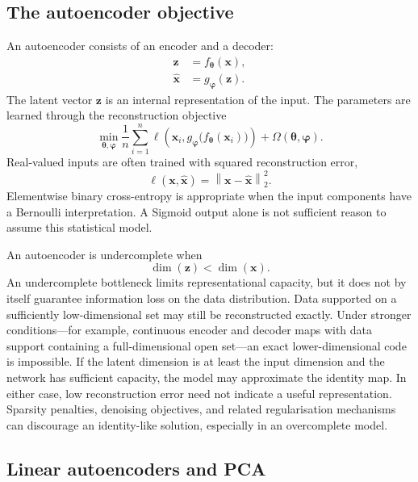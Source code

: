 \subsection{The autoencoder objective}

An autoencoder consists of an encoder and a decoder:
\begin{align}
    \mathbf{z}
    &=f_{\boldsymbol{\theta}}(\mathbf{x}),
    \label{eq:ae-encoder}\\
    \widehat{\mathbf{x}}
    &=g_{\boldsymbol{\varphi}}(\mathbf{z}).
    \label{eq:ae-decoder}
\end{align}
The latent vector \(\mathbf{z}\) is an internal representation of the input. The parameters are learned through the reconstruction objective
\begin{equation}
    \min_{\boldsymbol{\theta},\boldsymbol{\varphi}}
    \frac{1}{n}\sum_{i=1}^{n}
    \ell\!\left(
      \mathbf{x}_i,
      g_{\boldsymbol{\varphi}}
      \bigl(f_{\boldsymbol{\theta}}(\mathbf{x}_i)\bigr)
    \right)
    +\Omega(\boldsymbol{\theta},\boldsymbol{\varphi}).
    \label{eq:ae-objective}
\end{equation}
Real-valued inputs are often trained with squared reconstruction error,
\[
    \ell(\mathbf{x},\widehat{\mathbf{x}})
    =\left\lVert
      \mathbf{x}-\widehat{\mathbf{x}}
    \right\rVert_2^2.
\]
Elementwise binary cross-entropy is appropriate when the input components have a Bernoulli interpretation. A Sigmoid output alone is not sufficient reason to assume this statistical model.

An autoencoder is undercomplete when
\[
    \dim(\mathbf{z})<\dim(\mathbf{x}).
\]
An undercomplete bottleneck limits representational capacity, but it does not by itself guarantee information loss on the data distribution. Data supported on a sufficiently low-dimensional set may still be reconstructed exactly. Under stronger conditions---for example, continuous encoder and decoder maps with data support containing a full-dimensional open set---an exact lower-dimensional code is impossible. If the latent dimension is at least the input dimension and the network has sufficient capacity, the model may approximate the identity map. In either case, low reconstruction error need not indicate a useful representation. Sparsity penalties, denoising objectives, and related regularisation mechanisms can discourage an identity-like solution, especially in an overcomplete model.

\AutoencoderManifoldFigure

\subsection{Linear autoencoders and PCA}

